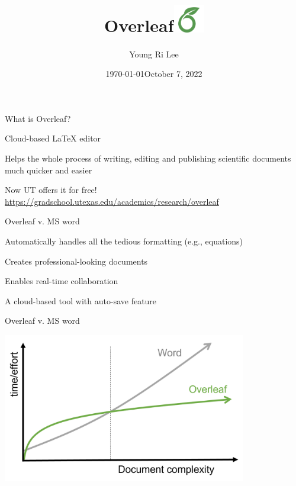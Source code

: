 \documentclass[13pt]{beamer}
\title{Overleaf\includegraphics[width=0.1\textwidth,keepaspectratio]{images/overleaf_og_logo.png}}
\author{Young Ri Lee}
\institute{QM, EDP\\The University of Texas at Austin}
\date{\today}
\date{October 7, 2022}
\newcommand{\itemA}{\item[\textcolor{black}{\textbullet}]}
\newcommand{\green}{\textcolor{colorgreen}}
\begin{document}
\begin{frame}[plain]
\maketitle
\end{frame}

\begin{frame}{What is Overleaf?}
 \begin{fullpageitemize}
    \itemA Cloud-based LaTeX editor
    \itemA Helps the whole process of writing, editing and publishing scientific documents much quicker and easier
    \itemA Now UT offers it for free!\\
    \green{\footnotesize{\url{https://gradschool.utexas.edu/academics/research/overleaf}}} \hfill \break
 \end{fullpageitemize}
 
\end{frame}

\begin{frame}{Overleaf v. MS word}

\begin{fullpageitemize}
    \itemA Automatically handles all the tedious formatting (e.g., equations) \green{} 
    \itemA Creates professional-looking documents  \green{} 
    \itemA Enables real-time collaboration \green{} 
    \itemA A cloud-based tool with auto-save feature \green{} 
    
 \end{fullpageitemize}
\end{frame}

\begin{frame}{Overleaf v. MS word}

\includegraphics[width=0.8\textwidth,keepaspectratio]{images/v_word.png}
\end{frame}
\end{document}
